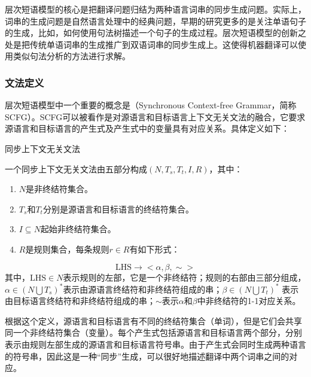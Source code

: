 \parinterval 层次短语模型的核心是把翻译问题归结为两种语言词串的同步生成问题。实际上，词串的生成问题是自然语言处理中的经典问题，早期的研究更多的是关注单语句子的生成，比如，如何使用句法树描述一个句子的生成过程。层次短语模型的创新之处是把传统单语词串的生成推广到双语词串的同步生成上。这使得机器翻译可以使用类似句法分析的方法进行求解。


\subsubsection{文法定义}

\parinterval 层次短语模型中一个重要的概念是{\small{}}（Synchronous Context-free Grammar，简称SCFG）。SCFG可以被看作是对源语言和目标语言上下文无关文法的融合，它要求源语言和目标语言的产生式及产生式中的变量具有对应关系。具体定义如下：

\vspace{0.5em}
\begin{definition} 同步上下文无关文法

{\small
一个同步上下文无关文法由五部分构成$(N, T_s, T_t, I, R)$，其中：
\begin{enumerate}
\item $N$是非终结符集合。
\item $T_s$和$T_t$分别是源语言和目标语言的终结符集合。
\item $I \subseteq N$起始非终结符集合。
\item $R$是规则集合，每条规则$r \in R$有如下形式：
\end{enumerate}
\begin{displaymath}
\textrm{LHS} \to <\alpha, \beta, \sim>
\end{displaymath}
其中，$\textrm{LHS} \in N$表示规则的左部，它是一个非终结符；规则的右部由三部分组成，$\alpha \in (N \bigcup T_s)^{*}$表示由源语言终结符和非终结符组成的串；$\beta \in (N \bigcup T_t)^{*}$ 表示由目标语言终结符和非终结符组成的串；$\sim$表示$\alpha$和$\beta$中非终结符的1-1对应关系。
}
\end{definition}

\parinterval 根据这个定义，源语言和目标语言有不同的终结符集合（单词），但是它们会共享同一个非终结符集合（变量）。每个产生式包括源语言和目标语言两个部分，分别表示由规则左部生成的源语言和目标语言符号串。由于产生式会同时生成两种语言的符号串，因此这是一种``同步''生成，可以很好地描述翻译中两个词串之间的对应。\\

